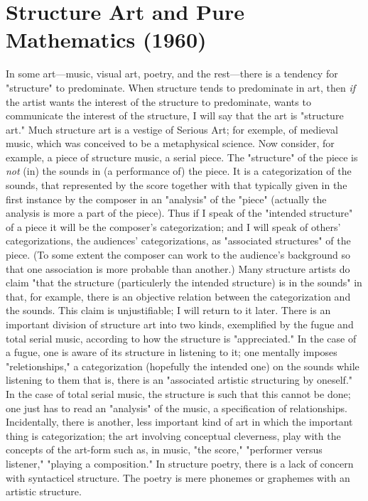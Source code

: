 \chapter{Structure Art and Pure Mathematics (1960)}

In some art---music, visual art, poetry, and the rest---there is a tendency for 
"structure" to predominate. When structure tends to predominate in art, then \emph{if} the 
artist wants the interest of the structure to predominate, wants to communicate the 
interest of the structure, I will say that the art is "structure art." Much structure 
art is a vestige of Serious Art; for exemple, of medieval music, which was conceived 
to be a metaphysical science. Now consider, for example, a piece of structure music, 
a serial piece. The "structure" of the piece is \emph{not} (in) the sounds in (a performance 
of) the piece. It is a categorization of the sounds, that represented by the score 
together with that typically given in the first instance by the composer in an "analysis" 
of the "piece" (actually the analysis is more a part of the piece). Thus if I speak 
of the "intended structure" of a piece it will be the composer's categorization; and I 
will speak of others' categorizations, the audiences' categorizations, as "associated 
structures" of the piece. (To some extent the composer can work to the audience's 
background so that one association is more probable than another.) Many structure 
artists do claim "that the structure (particulerly the intended structure) is in the 
sounds" in that, for example, there is an objective relation between the categorization 
and the sounds. This claim is unjustifiable; I will return to it later. There is an 
important division of structure art into two kinds, exemplified by the fugue and total 
serial music, according to how the structure is "appreciated." In the case of a fugue, 
one is aware of its structure in listening to it; one mentally imposes "reletionships," 
a categorization (hopefully the intended one) on the sounds while listening to them 
that is, there is an "associated artistic structuring by oneself." In the case of total 
serial music, the structure is such that this cannot be done; one just has to read an 
"analysis" of the music, a specification of relationships. Incidentally, there is 
another, less important kind of art in which the important thing is categorization; 
the art involving conceptual cleverness, play with the concepts of the art-form such as, 
in music, "the score," "performer versus listener," "playing a composition." In 
structure poetry, there is a lack of concern with syntacticel structure. The poetry 
is mere phonemes or graphemes with an artistic structure. 

